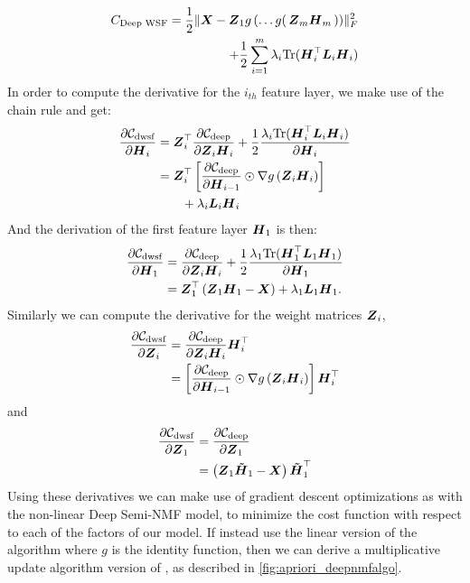 \documentclass[10pt,journal,compsoc]{IEEEtran}
\begin{document}
\begin{align} \label{eq:apriori_cost} \notag
C_{\text{{Deep WSF}}} = \frac{1}{2}\|{\boldsymbol{X}} - \boldsymbol{Z}_1 g\left(\ldots g\right(\boldsymbol{Z}_m {\boldsymbol{H}_m\left)\right)}\|^2_F  \\ + \frac{1}{2}\sum_{i=1}^{m} \lambda_i \text{Tr}(\boldsymbol{H}_i^\top \boldsymbol{L}_i \boldsymbol{H}_i)
\end{align}
In order to compute the derivative for the $i_{th}$ feature layer, we make use of the chain rule and get:
\begin{align*}
    \dfrac{\partial\mathcal{C}_{\text{dwsf}}}{\partial\boldsymbol{H}_i} &= \boldsymbol{Z}^{\top}_i \dfrac{\partial\mathcal{C}_{\text{deep}}}{\partial {\boldsymbol{Z}_i \boldsymbol{H}_i}} + \frac{1}{2}\dfrac{\lambda_i \text{Tr}(\boldsymbol{H}_i^\top \boldsymbol{L}_i \boldsymbol{H}_i)}{\partial \boldsymbol{H}_i}  \\
 &= \boldsymbol{Z}^{\top}_i \left[\dfrac{\partial\mathcal{C}_{\text{deep}}}{\partial \boldsymbol{H}_{i-1}} \odot \nabla g\left({\boldsymbol{Z}_i \boldsymbol{H}_i}\right)\right] \\ & \qquad +   \lambda_i \boldsymbol{L}_i \boldsymbol{H}_i
\end{align*}
And the derivation of the first feature layer $\boldsymbol{H}_1$ is then:
\begin{align*}
\dfrac{\partial\mathcal{C}_{\text{dwsf}}}{\partial \boldsymbol{H}_1} &=  \dfrac{\partial\mathcal{C}_{\text{deep}}}{\partial {\boldsymbol{Z}_i \boldsymbol{H}_i}} + \frac{1}{2} \dfrac{\lambda_1 \text{Tr}(\boldsymbol{H}_1^\top \boldsymbol{L}_1 \boldsymbol{H}_1)}{\partial \boldsymbol{H}_1} \\
& = \boldsymbol{Z}_1^{\top} \left(\boldsymbol{Z}_1 \boldsymbol{H}_1  - \boldsymbol{X} \right) + \lambda_1 \boldsymbol{L}_1 \boldsymbol{H}_1.
\end{align*}
Similarly we can compute the derivative for the weight matrices $\boldsymbol{Z}_i$, 
\begin{align*}
\dfrac{\partial\mathcal{C}_{\text{dwsf}}}{\partial \boldsymbol{Z}_i} &= \dfrac{\partial\mathcal{C}_{\text{deep}}}{\partial {\boldsymbol{Z}_i \boldsymbol{ H}_i}} \boldsymbol{ H}^{\top}_i \\
 &= \left[\dfrac{\partial\mathcal{C}_{\text{deep}}}{\partial \boldsymbol{H}_{i-1}} \odot \nabla g\left({\boldsymbol{Z}_i \boldsymbol{ H}_i}\right)\right] \boldsymbol{ H}^{\top}_i
\end{align*} and \begin{align*}
\dfrac{\partial\mathcal{C}_{\text{dwsf}}}{\partial \boldsymbol{Z}_1} &= \dfrac{\partial \mathcal{C}_{\text{deep}}}{\partial \boldsymbol{Z}_1} \\
& =   \left(\boldsymbol{Z}_1 \boldsymbol{\tilde{H}}_1 - \boldsymbol{X}\right) \boldsymbol{\tilde{H}}_1^\top 
\end{align*}
Using these derivatives we can make use of gradient descent optimizations as with the non-linear Deep Semi-NMF model, to minimize the cost function with respect to each of the factors of our model. If instead use the linear version of the algorithm where $g$ is the identity function, then we can derive a multiplicative update algorithm version of \dwsf, as described in \autoref{fig:apriori_deepnmfalgo}.
\end{document}
